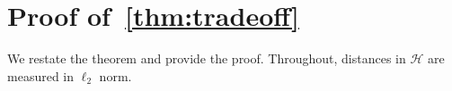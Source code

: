  
\section{Proof of~\cref{thm:tradeoff}}
\label{app:proof}

We restate the theorem and provide the proof. Throughout, distances in $\mathcal{H}$ are measured in $\ell_2$ norm.

